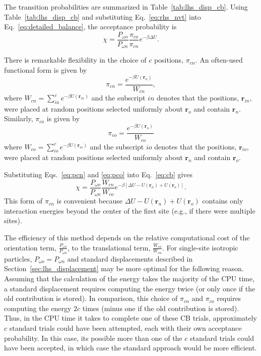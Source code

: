 \documentclass[
  9pt,
  bestpractices,
]{livecoms}
\begin{document}
The transition probabilities are summarized in Table~\ref{tab:lhs_disp_cb}.
Using Table~\ref{tab:lhs_disp_cb} and substituting Eq.~\ref{eq:rhs_nvt} into Eq.~\ref{eq:detailed_balance}, the acceptance probability is
\begin{equation}
\chi = \frac{P_{\omega o}}{P_{\omega n}}\frac{\pi_{co}}{\pi_{cn}}e^{-\beta \Delta U}.
\label{eq:cb}
\end{equation}

There is remarkable flexibility in the choice of $c$ positions, $\pi_{cn}$.
An often-used functional form is given by
\begin{equation}
\pi_{cn}=\frac{e^{-\beta U(\mathbf{r}_n)}}{W_{cn}},
\label{eq:pcn}
\end{equation}
where $W_{cn}=\sum_{in}^c e^{-\beta U(\mathbf{r}_{in})}$ and the subscript $in$ denotes that the positions, $\mathbf{r}_{in}$, were placed at random positions selected uniformly about $\mathbf{r}_o$ and contain $\mathbf{r}_n$.
Similarly, $\pi_{co}$ is given by
\begin{equation}
\pi_{co}=\frac{e^{-\beta U(\mathbf{r}_o)}}{W_{co}}
\label{eq:pco}
\end{equation}
where $W_{co}=\sum_{io}^c e^{-\beta U(\mathbf{r}_{io})}$ and the subscript $io$ denotes that the positions, $\mathbf{r}_{io}$, were placed at random positions selected uniformly about $\mathbf{r}_n$ and contain $\mathbf{r}_o$.

Substituting Eqs.~\ref{eq:pcn} and \ref{eq:pco} into Eq.~\ref{eq:cb} gives
\begin{equation}
\chi = \frac{P_{\omega o}}{P_{\omega n}}\frac{W_{cn}}{W_{co}}e^{-\beta[\Delta U - U(\mathbf{r}_n) + U(\mathbf{r}_o)]}.
\end{equation}
This form of $\pi_{cn}$ is convenient because $\Delta U - U(\mathbf{r}_n) + U(\mathbf{r}_o)$ contains only interaction energies beyond the center of the first site (e.g., if there were multiple sites).

The efficiency of this method depends on the relative computational cost of the orientation term, $\frac{P_{\omega o}}{P_{\omega n}}$, to the translational term, $\frac{W_{co}}{W_{cn}}$.
For single-site isotropic particles, $P_{\omega o}=P_{\omega n}$ and standard displacements described in Section~\ref{sec:lhs_displacement} may be more optimal for the following reason.
Assuming that the calculation of the energy takes the majority of the CPU time, a standard displacement requires computing the energy twice (or only once if the old contribution is stored).
In comparison, this choice of $\pi_{cn}$ and $\pi_{co}$ requires computing the energy $2c$ times (minus one if the old contribution is stored).
Thus, in the CPU time it takes to complete one of these CB trials, approximately $c$ standard trials could have been attempted, each with their own acceptance probability.
In this case, its possible more than one of the $c$ standard trials could have been accepted, in which case the standard approach would be more efficient.
\end{document}
